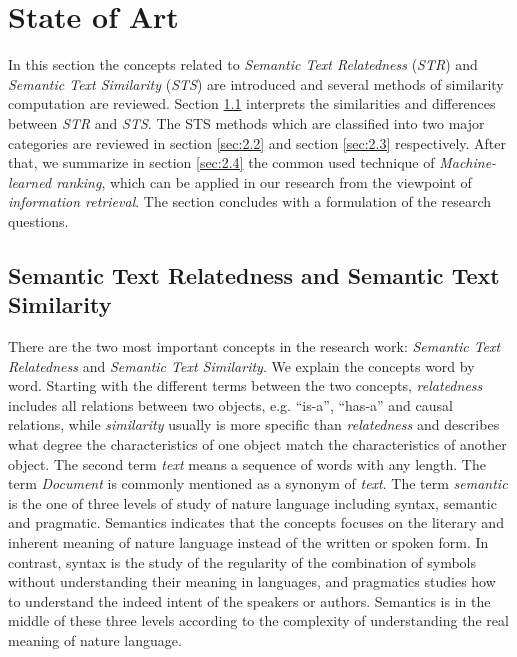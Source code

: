 \section{State of Art}
\label{sec:2}

In this section the concepts related to \textit{Semantic Text Relatedness} (\textit{STR}) and \textit{Semantic Text Similarity} (\textit{STS}) are introduced and several methods of similarity computation are reviewed. Section \ref{sec:2.1} interprets the similarities and differences between \textit{STR} and \textit{STS}. The STS methods which are classified into two major categories are reviewed in section \ref{sec:2.2} and section \ref{sec:2.3} respectively. After that, we summarize in section \ref{sec:2.4} the common used technique of \textit{Machine-learned ranking}, which can be applied in our research from the viewpoint of \textit{information retrieval}. The section concludes with a formulation of the research questions. 


\subsection{Semantic Text Relatedness and Semantic Text Similarity}
\label{sec:2.1}

There are the two most important concepts in the research work: \textit{Semantic Text Relatedness} and \textit{Semantic Text Similarity}. We explain the concepts word by word. Starting with the different terms between the two concepts, \textit{relatedness} includes all relations between two objects, e.g. ``is-a'', ``has-a'' and causal relations, while \textit{similarity} usually is more specific than \textit{relatedness} and describes what degree the characteristics of one object match the characteristics of another object. The second term \textit{text} means a sequence of words with any length. The term \textit{Document} is commonly mentioned as a synonym of \textit{text}. The term \textit{semantic} is the one of three levels of study of nature language including syntax, semantic and pragmatic. Semantics indicates that the concepts focuses on the literary and inherent meaning of nature language instead of the written or spoken form. In contrast, syntax is the study of the regularity of the combination of symbols without understanding their meaning in languages, and pragmatics studies how to understand the indeed intent of the speakers or authors. Semantics is in the middle of these three levels according to the complexity of understanding the real meaning of nature language. 

